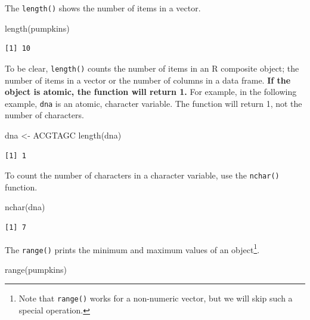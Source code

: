 \documentclass[
  letterpaper,
  DIV=11,
  numbers=noendperiod]{scrreprt}
\newenvironment{Shaded}{\begin{snugshade}}{\end{snugshade}}
\newcommand{\FunctionTok}[1]{\textcolor[rgb]{0.28,0.35,0.67}{#1}}
\newcommand{\NormalTok}[1]{\textcolor[rgb]{0.00,0.23,0.31}{#1}}
\newcommand{\OtherTok}[1]{\textcolor[rgb]{0.00,0.23,0.31}{#1}}
\newcommand{\StringTok}[1]{\textcolor[rgb]{0.13,0.47,0.30}{#1}}
\begin{document}
The \texttt{length()} shows the number of items in a vector.

\begin{Shaded}
\begin{Highlighting}[]
\FunctionTok{length}\NormalTok{(pumpkins)}
\end{Highlighting}
\end{Shaded}

\begin{verbatim}
[1] 10
\end{verbatim}

To be clear, \texttt{length()} counts the number of items in an R
composite object; the number of items in a vector or the number of
columns in a data frame. \textbf{If the object is atomic, the function
will return 1.} For example, in the following example, \texttt{dna} is
an atomic, character variable. The function will return 1, not the
number of characters.

\begin{Shaded}
\begin{Highlighting}[]
\NormalTok{dna }\OtherTok{\textless{}{-}} \StringTok{\textquotesingle{}ACGTAGC\textquotesingle{}}
\FunctionTok{length}\NormalTok{(dna)}
\end{Highlighting}
\end{Shaded}

\begin{verbatim}
[1] 1
\end{verbatim}

To count the number of characters in a character variable, use the
\texttt{nchar()} function.

\begin{Shaded}
\begin{Highlighting}[]
\FunctionTok{nchar}\NormalTok{(dna)}
\end{Highlighting}
\end{Shaded}

\begin{verbatim}
[1] 7
\end{verbatim}

The \texttt{range()} prints the minimum and maximum values of an
object\footnote{Note that \texttt{range()} works for a non-numeric
  vector, but we will skip such a special operation.}.

\begin{Shaded}
\begin{Highlighting}[]
\FunctionTok{range}\NormalTok{(pumpkins)}
\end{Highlighting}
\end{Shaded}
\end{document}
